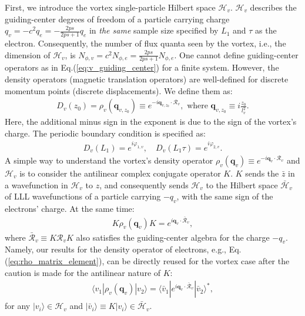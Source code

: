 First, we introduce the vortex single-particle Hilbert space $\mathcal H_v$. $\mathcal H_v$ describes the guiding-center degrees of freedom of a particle carrying charge $q_v=-c^2q_e=-\frac{2ps}{2ps+1}q_e$ in \emph{the same} sample size specified by $L_1$ and $\tau$ as the electron. Consequently, the number of flux quanta seen by the vortex, i.e., the dimension of $\mathcal H_v$, is $N_{\phi,v}=c^2 N_{\phi,e}=\frac{2ps}{2ps+1}N_{\phi,e}$. One cannot define guiding-center operators as in Eq.(\ref{eq:v_guiding_center}) for a finite system. However, the density operators (magnetic translation operators) are well-defined for discrete momentum points (discrete displacements). We define them as:
\begin{align}
    D_v(z_0)=\rho_v(\mathbf q_{v,z_0}) \equiv e^{-i\mathbf q_{v,z_0}\cdot \mathcal R_v},\text{ where }\mathbf q_{v,z_0}\equiv i\frac{z_0}{l_v^2}.\label{eq:D_v}
\end{align}
Here, the additional minus sign in the exponent is due to the sign of the vortex's charge. The periodic boundary condition is specified as:
\begin{align}
    D_v(L_1)=e^{i\varphi_{1,v}}, \quad D_v(L_1\tau)=e^{i\varphi_{2,v}}.
\end{align}
A simple way to understand the vortex's density operator $\rho_v(\mathbf q_v)\equiv e^{-i\mathbf q_{v}\cdot \mathcal R_v}$ and $\mathcal H_v$ is to consider the antilinear complex conjugate operator $K$. $K$ sends the $\bar z$ in a wavefunction in $\mathcal H_v$ to $z$, and consequently sends $\mathcal H_v$ to the Hilbert space $\bar{\mathcal H}_v$ of LLL wavefunctions of a particle carrying $-q_v$, with the same sign of the electrons' charge. At the same time:
\begin{align}
    K \rho_v(\mathbf q_v) K=e^{i\mathbf q_v\cdot \bar{\mathcal R}_v},
\end{align}
where $\bar{\mathcal R}_v\equiv K\mathcal R_v K$ also satisfies the guiding-center algebra for the charge $-q_v$. Namely, our results for the density operator of electrons, e.g., Eq.(\ref{eq:rho_matrix_element}), can be directly reused for the vortex case after the caution is made for the antilinear nature of $K$:
\begin{align}
    \langle v_1|\rho_v(\mathbf q_v)|v_2\rangle=\langle \bar{v}_1|e^{i\mathbf q_v\cdot \bar{\mathcal R}_v}|\bar{v}_2 \rangle^*,
\end{align}
for any $|v_i\rangle\in\mathcal H_v$ and $|\bar{v}_i \rangle\equiv K|v_i\rangle\in \bar{\mathcal H}_v$.

